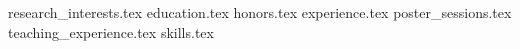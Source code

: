 \documentclass[11pt, a4paper]{awesome-cv}
\newcommand*{\sectiondir}{resume/}
\begin{document}
\makecvheader
{research_interests.tex}
{education.tex}
{honors.tex}
{experience.tex}
\newpage
{poster_sessions.tex}
{teaching_experience.tex}
{skills.tex}
\end{document}
